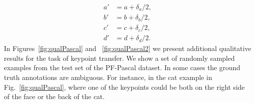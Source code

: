 \documentclass{article}
\begin{document}
\begin{equation}
\begin{split}
a'&=a+\delta_a/2,\\
b'&=b+\delta_b/2,\\
c'&=c+\delta_c/2,\\
d'&=d+\delta_d/2.
\end{split}
\end{equation}%
In Figures~\ref{fig:qualPascal} and ~\ref{fig:qualPascal2} we present additional qualitative results for the task of keypoint transfer. We show a set of randomly sampled examples from the test set of the PF-Pascal dataset. In some cases the ground truth annotations are ambiguous. For instance, in the cat example in Fig.~\ref{fig:qualPascal}, where one of the keypoints could be both on the right side of the face or the back of the cat.
\end{document}
